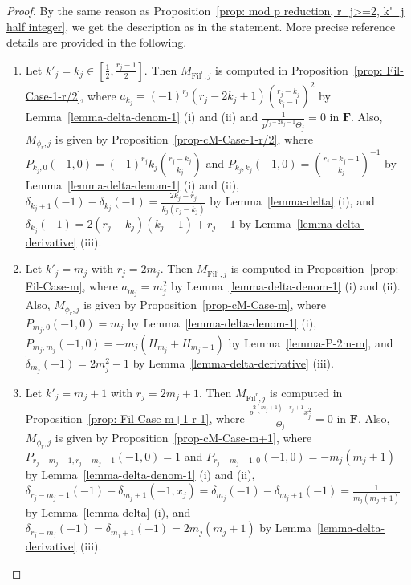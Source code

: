 \documentclass[11pt]{amsart}
\theoremstyle{definition}
\numberwithin{equation}{subsection}
\theoremstyle{plain}
\theoremstyle{plain}
\theoremstyle{plain}
\theoremstyle{plain}
\theoremstyle{plain}
\theoremstyle{plain}
\theoremstyle{plain}
\theoremstyle{plain}
\theoremstyle{plain}
\theoremstyle{plain}
\theoremstyle{plain}
\theoremstyle{plain}
\theoremstyle{definition}
\theoremstyle{definition}
\theoremstyle{definition}
\theoremstyle{remark}
\renewcommand{\(}{\textup{(}}
\renewcommand{\)}{\textup{)}}
\newcommand{\F}{\mathbf{F}}
\newcommand{\Fil}{\mathrm{Fil}}
\begin{document}
\begin{proof}
By the same reason as Proposition~\ref{prop: mod p reduction, r_j>=2, k'_j half integer}, we get the description as in the statement. More precise reference details are provided in the following.
\begin{enumerate}[leftmargin=*]
\item Let $k'_j=k_j\in[\frac{1}{2},\frac{r_j-1}{2}]$. Then $M_{\Fil^r,j}$ is computed in Proposition~\ref{prop: Fil-Case-1-r/2}, where $a_{k_j}=(-1)^{r_j}(r_j-2k_j+1)\binom{r_j-k_j}{k_j-1}^2$ by Lemma~\ref{lemma-delta-denom-1} (i) and (ii) and $\frac{1}{p^{r_j-2k_j-1}\Theta_j}=0$ in $\F$. Also, $M_{\phi_r,j}$ is given by Proposition~\ref{prop-cM-Case-1-r/2}, where $P_{k_j,0}(-1,0)=(-1)^{r_j}k_j\binom{r_j-k_j}{k_j}$ and $P_{k_j,k_j}(-1,0)=\binom{r_j-k_j-1}{k_j}^{-1}$ by Lemma~\ref{lemma-delta-denom-1} (i) and (ii), $\delta_{k_j+1}(-1)-\delta_{k_j}(-1)=\frac{2k_j-r_j}{k_j(r_j-k_j)}$ by Lemma~\ref{lemma-delta} (i), and $\dot\delta_{k_j}(-1)=2(r_j-k_j)(k_j-1)+r_j-1$ by Lemma~\ref{lemma-delta-derivative} (iii).
\item Let $k'_j=m_j$ with $r_j=2m_j$. Then $M_{\Fil^r,j}$ is computed in Proposition~\ref{prop: Fil-Case-m}, where $a_{m_j}=m_j^2$ by Lemma~\ref{lemma-delta-denom-1} (i) and (ii). Also, $M_{\phi_r,j}$ is given by Proposition~\ref{prop-cM-Case-m}, where $P_{m_j,0}(-1,0)=m_j$ by Lemma~\ref{lemma-delta-denom-1} (i), $P_{m_j,m_j}(-1,0)=-m_j(H_{m_j}+H_{m_j-1})$ by Lemma~\ref{lemma-P-2m-m}, and $\dot\delta_{m_j}(-1)=2m_j^2-1$ by Lemma~\ref{lemma-delta-derivative} (iii).
\item Let $k'_j=m_j+1$ with $r_j=2m_j+1$. Then $M_{\Fil^r,j}$ is computed in Proposition~\ref{prop: Fil-Case-m+1-r-1}, where $\frac{p^{2(m_j+1)-r_j+1}x_j^2}{\Theta_j}=0$ in $\F$. Also, $M_{\phi_r,j}$ is given by Proposition~\ref{prop-cM-Case-m+1}, where $P_{r_j-m_j-1,r_j-m_j-1}(-1,0)=1$ and $P_{r_j-m_j-1,0}(-1,0)=-m_j(m_j+1)$ by Lemma~\ref{lemma-delta-denom-1} (i) and (ii), $\delta_{r_j-m_j-1}(-1)-\delta_{m_j+1}(-1,x_j)=\delta_{m_j}(-1)-\delta_{m_j+1}(-1)=\frac{1}{m_j(m_j+1)}$ by Lemma~\ref{lemma-delta} (i), and $\dot\delta_{r_j-m_j}(-1)=\dot\delta_{m_j+1}(-1)=2m_j(m_j+1)$ by Lemma~\ref{lemma-delta-derivative} (iii).

\end{enumerate}
\end{proof}
\end{document}
